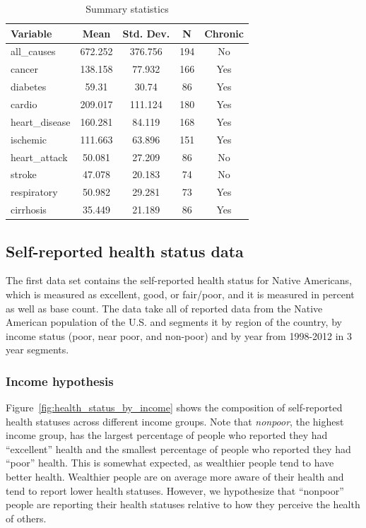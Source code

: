 \documentclass[12pt]{article}
\begin{document}
\begin{table}[htbp]\centering \caption{Summary statistics \label{sumstat}}
\begin{tabular}{l c c  c c}\hline\hline
\textbf{Variable} & \textbf{Mean} & \textbf{Std. Dev.} & \textbf{N} & \textbf{Chronic} \\\hline
all\_causes & 672.252 & 376.756  & 194 & No\\
cancer & 138.158 & 77.932  & 166 & Yes\\
diabetes & 59.31 & 30.74  & 86 & Yes\\
cardio & 209.017 & 111.124  & 180 & Yes\\
heart\_disease & 160.281 & 84.119  & 168 & Yes\\
ischemic & 111.663 & 63.896  & 151 & Yes\\
heart\_attack & 50.081 & 27.209  & 86 & No\\
stroke & 47.078 & 20.183  & 74 & No\\
respiratory & 50.982 & 29.281  & 73 & Yes\\
cirrhosis & 35.449 & 21.189  & 86 & Yes\\
\hline
\end{tabular}
\end{table}



\subsection{Self-reported health status data}
The first data set contains the self-reported health status for Native Americans, which is measured as excellent, good, or fair/poor, and it is measured in percent as well as base count.
The data take all of reported data from the Native American population of the U.S. and segments it by region of the country, by income status (poor, near poor, and non-poor) and by year from 1998-2012 in 3 year segments.

\subsubsection{Income hypothesis}
Figure~\ref{fig:health_status_by_income} shows the composition of self-reported health statuses across different income groups. Note that \emph{nonpoor}, the highest income group, has the largest percentage of people who reported they had ``excellent'' health and the smallest percentage of people who reported they had ``poor'' health. 
This is somewhat expected, as wealthier people tend to have better health. 
Wealthier people are on average more aware of their health and tend to report lower health statuses. 
However, we hypothesize that ``nonpoor'' people are reporting their health statuses relative to how they perceive the health of others. 
\end{document}

